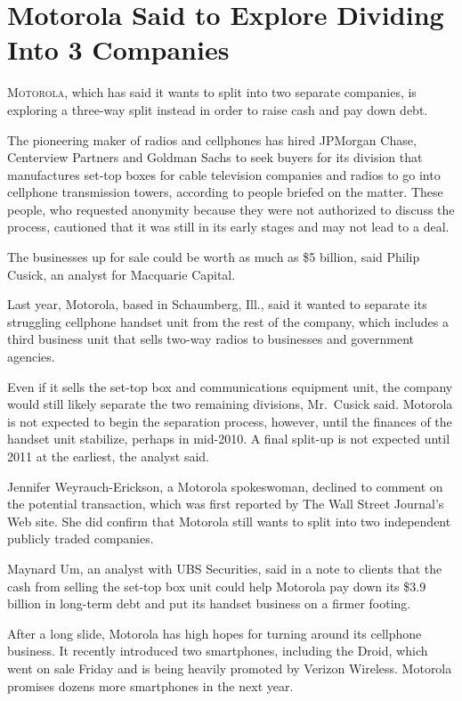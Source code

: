 ﻿\documentclass[12pt]{article}
\begin{document}
\section{Motorola Said to Explore Dividing Into 3 Companies}

\lettrine{M}{otorola}, which has said it wants to split into two separate
companies, is exploring a three-way split instead in order to raise cash and pay down debt.

The pioneering maker of radios and cellphones has hired JPMorgan Chase, Centerview Partners and
Goldman Sachs to seek buyers for its division that manufactures set-top boxes for cable television
companies and radios to go into cellphone transmission towers, according to people briefed on the
matter. These people, who requested anonymity because they were not authorized to discuss the
process, cautioned that it was still in its early stages and may not lead to a deal.

The businesses up for sale could be worth as much as \$5 billion, said Philip Cusick, an analyst for
Macquarie Capital.

Last year, Motorola, based in Schaumberg, Ill., said it wanted to separate its struggling cellphone
handset unit from the rest of the company, which includes a third business unit that sells two-way
radios to businesses and government agencies.

Even if it sells the set-top box and communications equipment unit, the company would still likely
separate the two remaining divisions, Mr.~Cusick said. Motorola is not expected to begin the
separation process, however, until the finances of the handset unit stabilize, perhaps in mid-2010.
A final split-up is not expected until 2011 at the earliest, the analyst said.

Jennifer Weyrauch-Erickson, a Motorola spokeswoman, declined to comment on the potential
transaction, which was first reported by The Wall Street Journal's Web site. She did confirm that
Motorola still wants to split into two independent publicly traded companies.

Maynard Um, an analyst with UBS Securities, said in a note to clients that the cash from selling the
set-top box unit could help Motorola pay down its \$3.9 billion in long-term debt and put its
handset business on a firmer footing.

After a long slide, Motorola has high hopes for turning around its cellphone business. It recently
introduced two smartphones, including the Droid, which went on sale Friday and is being heavily
promoted by Verizon Wireless. Motorola promises dozens more smartphones in the next year.
\end{document}
